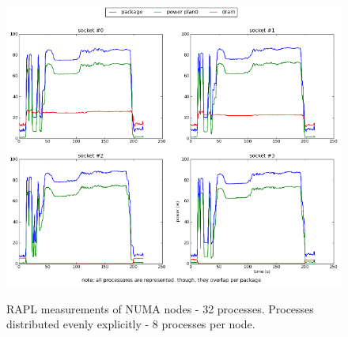 \begin{figure}[h!]
  \centering
    \includegraphics[width=150mm]{"img/numa/32proc_explicitly_distributed"}
    \label{fig:nf_ss}
    \caption{RAPL measurements of NUMA nodes - 32 processes. Processes
distributed evenly explicitly - 8 processes per node. }
\end{figure}



